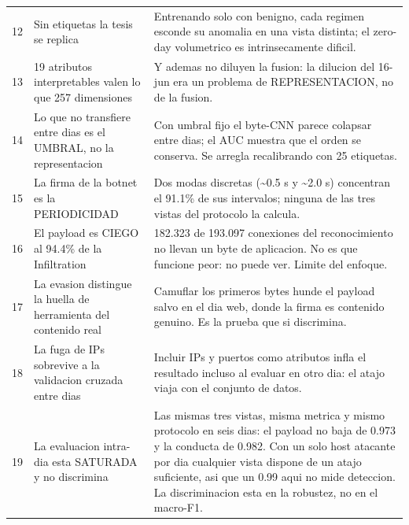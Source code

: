 \begin{table}[htbp]
\begin{tabular}{cp{}p{}}
    12 & Sin etiquetas la tesis se replica & Entrenando solo con benigno, cada regimen esconde su anomalia en una vista distinta; el zero-day volumetrico es intrinsecamente dificil. \\
    13 & 19 atributos interpretables valen lo que 257 dimensiones & Y ademas no diluyen la fusion: la dilucion del 16-jun era un problema de REPRESENTACION, no de la fusion. \\
    14 & Lo que no transfiere entre dias es el UMBRAL, no la representacion & Con umbral fijo el byte-CNN parece colapsar entre dias; el AUC muestra que el orden se conserva. Se arregla recalibrando con 25 etiquetas. \\
    15 & La firma de la botnet es la PERIODICIDAD & Dos modas discretas (\textasciitilde{}0.5 s y \textasciitilde{}2.0 s) concentran el 91.1\% de sus intervalos; ninguna de las tres vistas del protocolo la calcula. \\
    16 & El payload es CIEGO al 94.4\% de la Infiltration & 182.323 de 193.097 conexiones del reconocimiento no llevan un byte de aplicacion. No es que funcione peor: no puede ver. Limite del enfoque. \\
    17 & La evasion distingue la huella de herramienta del contenido real & Camuflar los primeros bytes hunde el payload salvo en el dia web, donde la firma es contenido genuino. Es la prueba que si discrimina. \\
    18 & La fuga de IPs sobrevive a la validacion cruzada entre dias & Incluir IPs y puertos como atributos infla el resultado incluso al evaluar en otro dia: el atajo viaja con el conjunto de datos. \\
    19 & La evaluacion intra-dia esta SATURADA y no discrimina & Las mismas tres vistas, misma metrica y mismo protocolo en seis dias: el payload no baja de 0.973 y la conducta de 0.982. Con un solo host atacante por dia cualquier vista dispone de un atajo suficiente, asi que un 0.99 aqui no mide deteccion. La discriminacion esta en la robustez, no en el macro-F1. \\
    \bottomrule
  \end{tabular}
\end{table}
